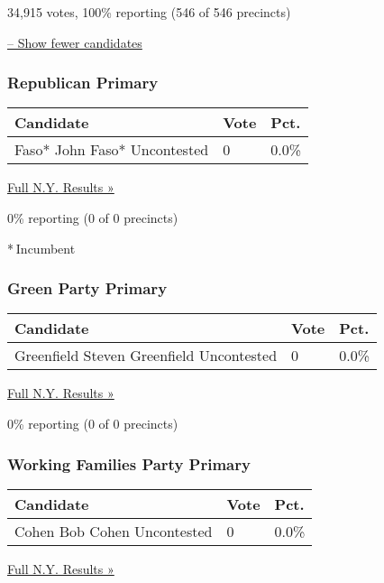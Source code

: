 34,915 votes, 100\% reporting (546 of 546 precincts)

\protect\hyperlink{}{-- Show fewer candidates}

\hypertarget{republican-primary-13}{%
\subsubsection{Republican Primary}\label{republican-primary-13}}

\begin{longtable}[]{@{}lll@{}}
\toprule
Candidate & Vote & Pct.\tabularnewline
\midrule
\endhead
 Faso* John Faso* Uncontested & 0 & 0.0\%\tabularnewline
\bottomrule
\end{longtable}

\href{https://www.nytimes3xbfgragh.onion/elections/results/new-york}{Full
N.Y. Results »}

0\% reporting (0 of 0 precincts)

* Incumbent

\hypertarget{green-party-primary-3}{%
\subsubsection{Green Party Primary}\label{green-party-primary-3}}

\begin{longtable}[]{@{}lll@{}}
\toprule
Candidate & Vote & Pct.\tabularnewline
\midrule
\endhead
 Greenfield Steven Greenfield Uncontested & 0 & 0.0\%\tabularnewline
\bottomrule
\end{longtable}

\href{https://www.nytimes3xbfgragh.onion/elections/results/new-york}{Full
N.Y. Results »}

0\% reporting (0 of 0 precincts)

\hypertarget{working-families-party-primary-1}{%
\subsubsection{Working Families Party
Primary}\label{working-families-party-primary-1}}

\begin{longtable}[]{@{}lll@{}}
\toprule
Candidate & Vote & Pct.\tabularnewline
\midrule
\endhead
 Cohen Bob Cohen Uncontested & 0 & 0.0\%\tabularnewline
\bottomrule
\end{longtable}

\href{https://www.nytimes3xbfgragh.onion/elections/results/new-york}{Full
N.Y. Results »}

